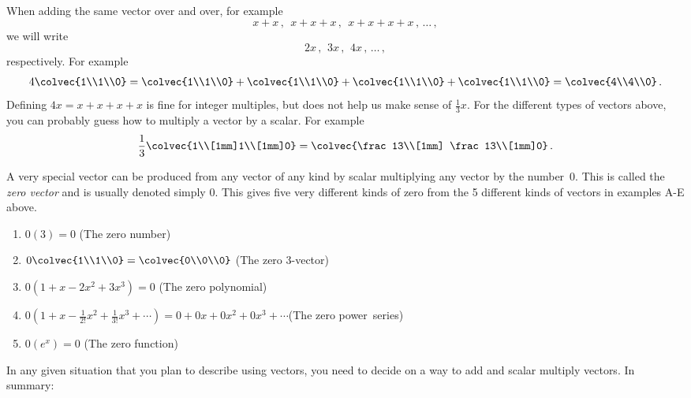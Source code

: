 When adding the same vector over and over, for example
\[
x+x\, ,\: \  x+x+x\, ,\:\    x+x+x+x\,  ,\, \ldots\, ,
\]
we will write
\[
2x\, ,\: \, 3x\, , \:\,  4x\, ,\, \ldots\, ,
\]
respectively. For example
\[
4\colvec{1\\1\\0}=\colvec{1\\1\\0}+\colvec{1\\1\\0}+\colvec{1\\1\\0}+\colvec{1\\1\\0}=\colvec{4\\4\\0}\, .
\]
Defining $4x=x+x+x+x$ is fine for integer multiples, but does not help us make sense of $\frac13 x$. For the different types of vectors 
above, you can probably guess how to multiply a vector by a scalar. For example
\[
\frac 13 \colvec{1\\[1mm]1\\[1mm]0} = \colvec{\frac13\\[1mm] \frac13\\[1mm]0}\, .
\]

 A very special vector can be produced from any vector of any kind by scalar multiplying any vector by the number~$0$. 
This is called the {\itshape zero vector} and is usually denoted simply $0$. This gives five very different kinds of zero from the 5 different kinds of vectors in   examples A-E above.
\begin{enumerate}\renewcommand{\theenumi}{(\Alph*{enumi})}
\item $0(3)=0$ (The zero number)
\item $0\colvec{1\\1\\0}=\colvec{0\\0\\0} $ (The zero 3-vector)
\item $0\left(1+x-2x^2+3x^3\right)=0$ (The zero polynomial)
\item 
$0\!\left(  1+x\!-\!\frac1{2!}x^2\!+\!\frac1{3!}x^3\!+\cdots \!\right) \!
 =  0+0x+0x^2\!+0x^3\!+\cdots $(The zero power~series)
 \item $0\left(   e^x \right) =0$ (The zero function)
\end{enumerate}

In any given situation that you plan to describe using vectors, you need to decide on a way to add and scalar multiply vectors.
In summary:
\vspace{3mm}
\begin{center}
\end{center}
\vspace{3mm}

